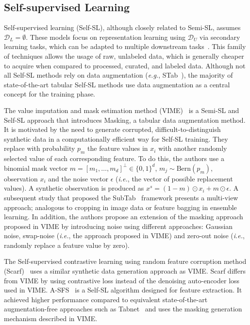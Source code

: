 \subsection{Self-supervised Learning}\label{sec:self-supervised-learning}

Self-supervised learning (Self-SL), although closely related to Semi-SL,
assumes $\mathcal{D}_L = \emptyset$. These models focus
on representation learning using $\mathcal{D}_U$ via secondary learning
tasks, which can be adapted to multiple downstream
tasks~\cite{liu2021self}. This family of techniques allows the usage of raw,
unlabeled data, which is generally cheaper to acquire when compared to
processed, curated, and labeled data. Although not all Self-SL methods rely on
data augmentation (\textit{e.g.}, STab~\cite{hajiramezanali2022stab}), the
majority of state-of-the-art tabular Self-SL methods use data augmentation as
a central concept for the training phase.

The value imputation and mask estimation method (VIME)~\cite{yoon2020vime} is
a Semi-SL and Self-SL approach that introduces Masking, a tabular data
augmentation method. It is motivated by the need to generate corrupted,
difficult-to-distinguish synthetic data in a computationally efficient way for
Self-SL training. They replace with probability $p_m$ the feature values in $x_i$
with another randomly selected value of each corresponding feature. To do
this, the authors use a binomial mask vector $m=[m_1, \ldots, m_d]^\bot \in
\{0,1\}^d$, $m_j \sim \text{Bern}(p_m)$, observation $x_i$ and the noise vector
$\epsilon$ (\textit{i.e.}, the vector of possible replacement values). A
synthetic observation is produced as $x^s=(1-m) \odot x_i + m \odot \epsilon$.
A subsequent study that proposed the SubTab~\cite{ucar2021subtab}
framework presents a multi-view approach; analogous to cropping in image data
or feature bagging in ensemble learning. In addition, the authors propose an
extension of the masking approach proposed in VIME by introducing noise using
different approaches: Gaussian noise, swap-noise (\textit{i.e.}, the approach
proposed in VIME) and zero-out noise (\textit{i.e.}, randomly replace a
feature value by zero).

The Self-supervised contrastive learning using random feature corruption
method (Scarf)~\cite{bahri2022scarf} uses a similar synthetic data generation
approach as VIME. Scarf differs from VIME by using contrastive loss instead of
the denoising auto-encoder loss used in VIME. A-SFS~\cite{qiu2022sfs} is a
Self-SL algorithm designed for feature extraction. It achieved higher
performance compared to equivalent state-of-the-art augmentation-free
approaches such as Tabnet~\cite{arik2021tabnet} and uses the masking
generation mechanism described in VIME.



